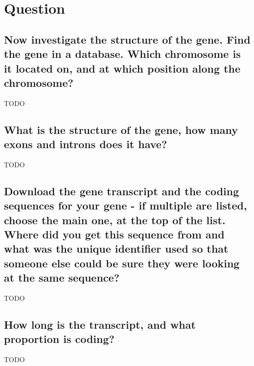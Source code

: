 \section{Question}

\subsection{Now investigate the structure of the gene. Find the gene in a database. Which chromosome is it located on, and at which position along the chromosome?}

TODO

\medskip


\subsection{What is the structure of the gene, how many exons and introns does it have?}

TODO

\medskip


\subsection{Download the gene transcript and the coding sequences for your gene - if multiple are listed, choose the main one, at the top of the list. Where did you get this sequence from and what was the unique identifier used so that someone else could be sure they were looking at the same sequence?}

TODO

\medskip


\subsection{How long is the transcript, and what proportion is coding?}

TODO

\newpage
